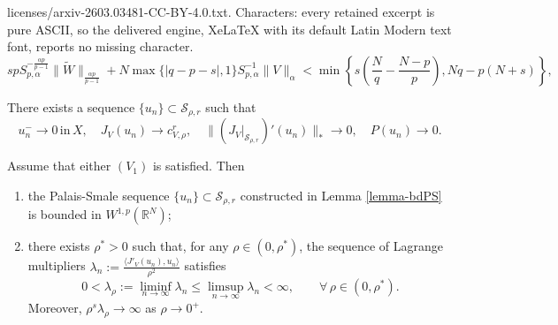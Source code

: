\documentclass[10pt,a4paper]{amsart}
\newcommand{\rn}{\mathbb{R}^N}
\begin{document}
licenses/arxiv-2603.03481-CC-BY-4.0.txt. Characters: every retained excerpt is pure ASCII, so the delivered engine, XeLaTeX with its default Latin Modern text font, reports no missing character.
\begin{equation}
\label{cond-norm-V}
sp S_{p,\alpha}^{-\frac{\alpha p}{p-1}}\|\tilde{W}\|_{\frac{\alpha p}{p-1}}+N\max\{|q-p-s|,1\}S_{p,\alpha}^{-1}\|V\|_\alpha <\min\left\{s\left(\frac{N}{q}-\frac{N-p}{p}\right),Nq-p(N+s)\right\},
\end{equation}

\begin{lemma}\label{lemma-bdPS}
There exists a sequence $\{u_n\}\subset \mathcal{S}_{\rho,r}$ such that
\begin{equation}\label{PS-pohozaev}
u_n^-\to 0 \,\text{in}\,X,\quad J_V(u_n)\to c^r_{V,\rho},\quad \|(J_V|_{\mathcal{S}_{\rho,r}})'(u_n)\|_*\to 0,\quad P(u_n)\to 0.
\end{equation}
\end{lemma}

\begin{lemma}\label{lemma-bd-lambda>0}
Assume that either $(V_1)$ %
is satisfied. %
Then 
\begin{enumerate}
    \item the Palais-Smale sequence $\{u_n\}\subset \mathcal{S}_{\rho,r}$ constructed in Lemma \ref{lemma-bdPS} is bounded in $W^{1,p}(\rn)$;
    \item there exists $\rho^*>0$ such that, for any $\rho\in(0,\rho^*)$, the sequence of Lagrange multipliers $\lambda_n:=\frac{\langle J'_V(u_n),u_n\rangle}{\rho^2}$ satisfies 
    \begin{equation}\label{lambda-infty}
    0<\lambda_\rho:=\liminf_{n\to\infty}\lambda_n\le \limsup_{n\to\infty}\lambda_n<\infty,\qquad\forall\,\rho\in(0,\rho^*).
    \end{equation}
    Moreover, $\rho^s\lambda_\rho\to \infty$ as $\rho\to 0^+$.
\end{enumerate}
\end{lemma}
\end{document}
